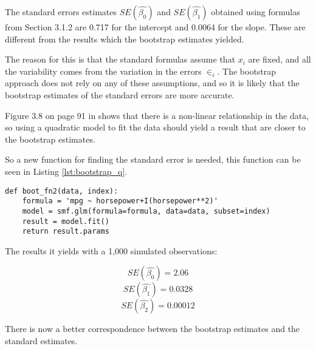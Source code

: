 The standard errors estimates $SE(\hat{\beta_0})$ and $SE(\hat{\beta_1})$ obtained using formulas from Section 3.1.2\citep{ISLR} are 0.717 for the intercept and 0.0064 for the slope. These are different from the results which the bootstrap estimates yielded.

The reason for this is that the standard formulas assume that $x_i$ are fixed, and all the variability comes from the variation in the errors $\in_i$. The bootstrap approach does not rely on any of these assumptions, and so it is likely that the bootstrap estimates of the standard errors are more accurate.

Figure 3.8 on page 91 in \citep{ISLR} shows that there is a non-linear relationship in the data, so using a quadratic model to fit the data should yield a result that are closer to the bootstrap estimates.

So a new function for finding the standard error is needed, this function can be seen in Listing \ref{lst:bootstrap_q}.

\begin{lstlisting}[caption={Function to calculate standard error with a qudratic model}, label=lst:bootstrap_q, mathescape=true]
def boot_fn2(data, index):
	formula = 'mpg ~ horsepower+I(horsepower**2)'
	model = smf.glm(formula=formula, data=data, subset=index)
	result = model.fit()
	return result.params
\end{lstlisting}

The results it yields with a 1,000 simulated observations:

\begin{equation}
SE(\hat{\beta_0}) = 2.06
\end{equation}
\begin{equation}
SE(\hat{\beta_1}) = 0.0328
\end{equation}
\begin{equation}
SE(\hat{\beta_2}) = 0.00012
\end{equation}

There is now a better correspondence between the bootstrap estimates and the standard estimates.